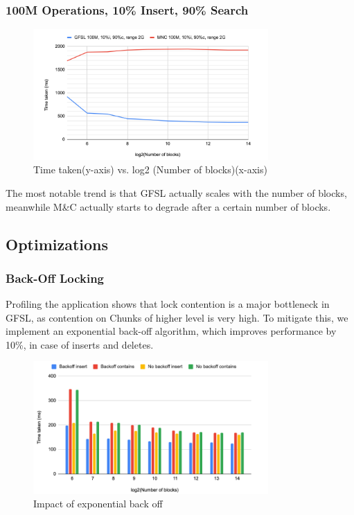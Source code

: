 \documentclass[12pt,a4paper]{article}
\begin{document}
\subsubsection{100M Operations, 10\% Insert, 90\% Search}
\begin{figure}[H]
    \centering
    \includegraphics[width=0.8\textwidth]{7.png}
    \caption{Time taken(y-axis) vs. log2 (Number of blocks)(x-axis)}
\end{figure}

The most notable trend is that GFSL actually scales with the number of blocks, meanwhile M\&C actually starts to degrade after a certain number of blocks.

\subsection{Optimizations}

\subsubsection{Back-Off Locking}
Profiling the application shows that lock contention is a major bottleneck in GFSL, as contention on Chunks of higher level is very high. To mitigate this, we implement an exponential back-off algorithm, which improves performance by 10\%, in case of inserts and deletes.

\begin{figure}[H]
    \centering
    \includegraphics[width=0.8\textwidth]{8.png}
    \caption{Impact of exponential back off}
\end{figure}
\end{document}
